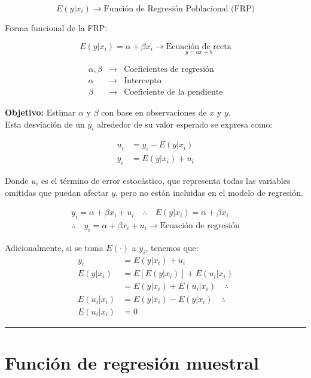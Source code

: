 \documentclass[
]{book}
\begin{document}
\[
E(y|x_i) \rightarrow \text{Función de Regresión Poblacional (FRP)}
\]

Forma funcional de la FRP:

\[
E(y|x_i) = \alpha + \beta x_i \rightarrow \underset{y = ax+b}{\text{Ecuación de recta}}
\]

\[
\begin{array}{ccc} 
\alpha, \beta & \rightarrow & \text{Coeficientes de regresión} \\
\alpha & \rightarrow & \text{Intercepto} \\
\beta & \rightarrow & \text{Coeficiente de la pendiente}
\end{array}
\]

\textbf{Objetivo:} Estimar \(\alpha\) y \(\beta\) con base en observaciones de \(x\) y \(y\).\\
Esta desviación de un \(y_i\) alrededor de su valor esperado se expresa como:

\[
\begin{aligned}
u_i &= y_i - E(y|x_i) \\
y_i &= E(y|x_i) + u_i
\end{aligned}
\]

Donde \(u_i\) es el término de error estocástico, que representa todas las variables omitidas que puedan afectar \(y\), pero no están incluidas en el modelo de regresión.

\[
\begin{aligned}
y_i = \alpha + \beta x_i + u_i \quad \therefore \quad E(y|x_i) = \alpha + \beta x_i \\
\therefore \quad y_i = \alpha + \beta x_i + u_i \rightarrow \text{Ecuación de regresión}
\end{aligned}
\]

Adicionalmente, si se toma \(E(\cdot)\) a \(y_i\), tenemos que:
\[
\begin{aligned}
y_i &= E(y|x_i) + u_i \\
E(y|x_i) &= E[E(y|x_i)] + E(u_i|x_i) \\
&= E(y|x_i) + E(u_i|x_i) \quad \therefore \\
E(u_i|x_i) &= E(y|x_i) - E(y|x_i) \quad \therefore \\
E(u_i|x_i) &= 0
\end{aligned}
\]

\begin{center}\rule{0.5\linewidth}{0.5pt}\end{center}

\hypertarget{funciuxf3n-de-regresiuxf3n-muestral}{%
\section{Función de regresión muestral}\label{funciuxf3n-de-regresiuxf3n-muestral}}
\end{document}
